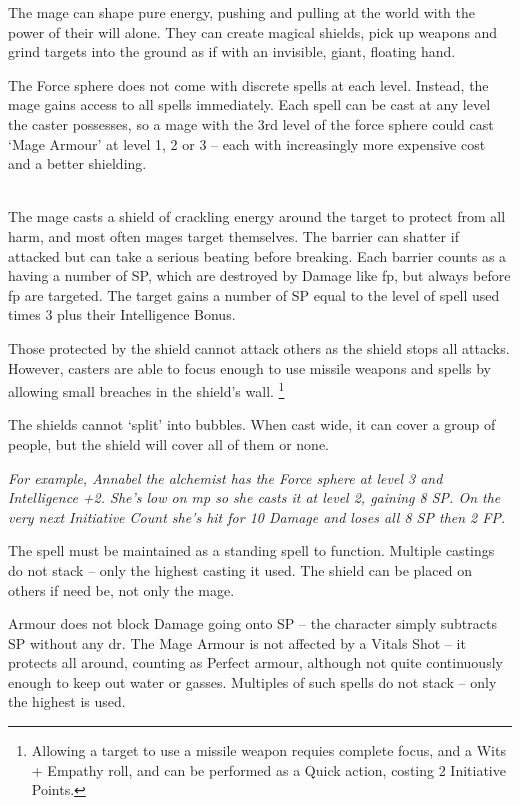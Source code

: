 
\begin{multicols}{2}

The mage can shape pure energy, pushing and pulling at the world with the power of their will alone. They can create magical shields, pick up weapons and grind targets into the ground as if with an invisible, giant, floating hand.

The Force sphere does not come with discrete spells at each level.
Instead, the mage gains access to all spells immediately.
Each spell can be cast at any level the caster possesses, so a mage with the 3rd level of the force sphere could cast `Mage Armour' at level 1, 2 or 3 -- each with increasingly more expensive cost and a better shielding.

\\
The mage casts a shield of crackling energy around the target to protect from all harm, and most often mages target themselves.  The barrier can shatter if attacked but can take a serious beating before breaking. Each barrier counts as a having a number of \gls{SP}, which are destroyed by Damage like \gls{fp}, but always before \gls{fp} are targeted.
The target gains a number of \gls{SP} equal to the level of spell used times 3 plus their Intelligence Bonus.

Those protected by the shield cannot attack others as the shield stops all attacks.
However, casters are able to focus enough to use missile weapons and spells by allowing small breaches in the shield's wall.
\footnote{Allowing a target to use a missile weapon requies complete focus, and a Wits + Empathy roll, and can be performed as a Quick action, costing 2 Initiative Points.}

The shields cannot `split' into bubbles.
When cast wide, it can cover a group of people, but the shield will cover all of them or none.

\textit{For example, Annabel the alchemist has the Force sphere at level 3 and Intelligence +2.
She's low on \gls{mp} so she casts it at level 2, gaining 8 \gls{SP}.
On the very next Initiative Count she's hit for 10 Damage and loses all 8 \gls{SP} then 2 FP.}

The spell must be maintained as a standing spell to function. Multiple castings do not stack -- only the highest casting it used. The shield can be placed on others if need be, not only the mage.

Armour does not block Damage going onto \gls{SP} -- the character simply subtracts \gls{SP} without any \gls{dr}. The Mage Armour is not affected by a Vitals Shot -- it protects all around, counting as Perfect armour, although not quite continuously enough to keep out water or gasses. Multiples of such spells do not stack -- only the highest is used.


\end{multicols}
